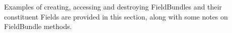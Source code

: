 

Examples of creating, accessing and destroying FieldBundles and their
constituent Fields are provided in this section, along with some
notes on FieldBundle methods.
